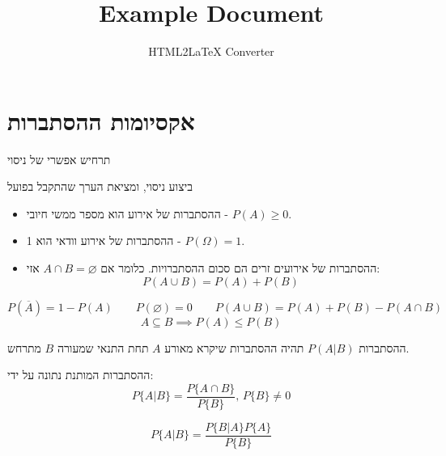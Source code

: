 \documentclass{tstextbook}
\begin{document}
\title{Example Document}
\author{HTML2LaTeX Converter}
\maketitle


\section{אקסיומות ההסתברות}

\begin{definition}[אירוע]
תרחיש אפשרי של ניסוי

\end{definition}
\begin{definition}[מדידה]
ביצוע ניסוי, ומציאת הערך שהתקבל בפועל

\end{definition}
\begin{definition}
  \begin{itemize}
    \item ההסתברות של אירוע הוא מספר ממשי חיובי - \(P(A)\geq 0\).
    \item ההסתברות של אירוע וודאי הוא 1 - \(P\left( \Omega \right)=1\).
    \item ההסתברות של אירועים זרים הם סכום ההסתברויות. כלומר אם \(A\cap B = \varnothing\) אזי:
$$P\left( A\cup B \right)=P(A)+P(B)$$
  \end{itemize}
\end{definition}
\begin{corollary}
$$P\left( \overline{A}  \right)=1-P(A)\qquad P\left( \varnothing  \right)=0\qquad P\left( A\cup B \right)=P(A)+P(B)-P\left( A\cap B \right)$$$$A\subseteq B\implies P(A)\leq P(B)$$

\end{corollary}
\begin{definition}
ההסתברות \(P(A|B)\) תהיה ההסתברות שיקרא מאורע \(A\) תחת התנאי שמעורה \(B\) מתרחש.

\end{definition}
\begin{proposition}
ההסתברות המותנת נתונה על ידי:
$$P\{A|B\}={\frac{P\{A\cap B\}}{P\{B\}}},\,P\{B\}\neq0$$

\end{proposition}
\begin{corollary}
$$P\{A|B\}={\frac{P\{B|A\}P\{A\}}{P\{B\}}}$$

\end{corollary}
\end{document}
